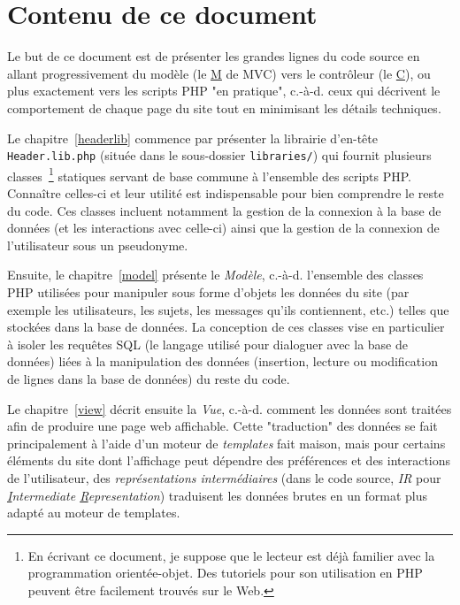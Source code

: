 \section{Contenu de ce document}\label{intro.chapitrage}

Le but de ce document est de présenter les grandes lignes du code source en allant progressivement 
du modèle (le \underline{M} de MVC) vers le contrôleur (le \underline{C}), ou plus exactement vers 
les scripts PHP "en pratique", c.-à-d. ceux qui décrivent le comportement de chaque page du site 
tout en minimisant les détails techniques.

Le chapitre~\ref{headerlib} commence par présenter la librairie d'en-tête \texttt{Header.lib.php} 
(située dans le sous-dossier \texttt{libraries/}) qui fournit plusieurs classes~\footnote{En 
écrivant ce document, je suppose que le lecteur est déjà familier avec la programmation 
orientée-objet. Des tutoriels pour son utilisation en PHP peuvent être facilement trouvés sur le 
Web.} statiques servant de base commune à l'ensemble des scripts PHP. Connaître celles-ci et leur 
utilité est indispensable pour bien comprendre le reste du code. Ces classes incluent notamment la 
gestion de la connexion à la base de données (et les interactions avec celle-ci) ainsi que la 
gestion de la connexion de l'utilisateur sous un pseudonyme.

Ensuite, le chapitre~\ref{model} présente le \textit{Modèle}, c.-à-d. l'ensemble des classes PHP 
utilisées pour manipuler sous forme d'objets les données du site (par exemple les utilisateurs, 
les sujets, les messages qu'ils contiennent, etc.) telles que stockées dans la base de données. La 
conception de ces classes vise en particulier à isoler les requêtes SQL (le langage utilisé pour 
dialoguer avec la base de données) liées à la manipulation des données (insertion, lecture ou 
modification de lignes dans la base de données) du reste du code.

Le chapitre~\ref{view} décrit ensuite la \textit{Vue}, c.-à-d. comment les données sont traitées 
afin de produire une page web affichable. Cette "traduction" des données se fait principalement 
à l'aide d'un moteur de \textit{templates} fait maison, mais pour certains éléments du site dont 
l'affichage peut dépendre des préférences et des interactions de l'utilisateur, des 
\textit{représentations intermédiaires} (dans le code source, \textit{IR} pour 
\textit{\underline{I}ntermediate \underline{R}epresentation}) traduisent les données brutes en un 
format plus adapté au moteur de templates.

